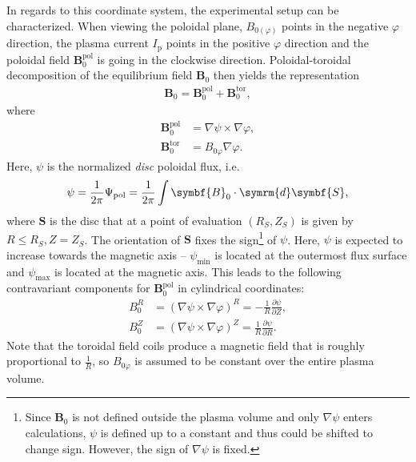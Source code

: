 \documentclass[a4paper, twoside, 10pt, english]{article}
\numberwithin{equation}{section}
\let\temp\varrho
\let\varrho\rho
\let\rho\temp
\let\temp\vartheta
\let\vartheta\theta
\let\theta\temp
\let\temp\varphi
\let\varphi\phi
\let\phi\temp
\let\vec\symbf
\newcommand*\grad{\ensuremath{\nabla}}
\newcommand*\diff{\ensuremath{\symrm{d}}}  %
\newcommand*\pd[2][]{\ensuremath{\frac{\partial #1}{\partial #2}}}  %
\newcommand*\pol{\ensuremath{\textrm{pol}}}  %
\newcommand*\tor{\ensuremath{\textrm{tor}}}  %
\begin{document}
In regards to this coordinate system, the experimental setup can be characterized. When viewing the poloidal plane, $B_{0 (\phi)}$ points in the negative $\phi$ direction, the plasma current $I_{\text{p}}$ points in the positive $\phi$ direction and the poloidal field $\vec{B}_{0}^{\pol}$ is going in the clockwise direction. Poloidal-toroidal decomposition of the equilibrium field $\vec{B}_{0}$ then yields the representation
\begin{gather}
  \vec{B}_{0} = \vec{B}_{0}^{\pol} + \vec{B}_{0}^{\tor}, \label{eq:B_pol_tor}
\end{gather}
where 
\begin{align}
  \vec{B}_{0}^{\pol} &= \grad \psi \times \grad \phi, \label{eq:B_pol} \\
  \vec{B}_{0}^{\tor} &= B_{0 \phi} \grad \phi. \label{eq:B_tor}
\end{align}
Here, $\psi$ is the normalized \emph{disc} poloidal flux, i.e.
\begin{gather}
  \psi = \frac{1}{2 \pi} \Psi_{\pol} = \frac{1}{2 \pi} \int \vec{B}_{0} \cdot \diff \vec{S},
\end{gather}
where $\vec{S}$ is the disc that at a point of evaluation $(R_{S}, Z_{S})$ is given by $R \leq R_{S}, Z = Z_{S}$. The orientation of $\vec{S}$ fixes the sign\footnote{Since $\vec{B}_{0}$ is not defined outside the plasma volume and only $\grad \psi$ enters calculations, $\psi$ is defined up to a constant and thus could be shifted to change sign. However, the sign of $\grad \psi$ is fixed.} of $\psi$. Here, $\psi$ is expected to increase towards the magnetic axis -- $\psi_{\text{min}}$ is located at the outermost flux surface and $\psi_{\text{max}}$ is located at the magnetic axis. This leads to the following contravariant components for $\vec{B}_{0}^{\pol}$ in cylindrical coordinates:
\begin{align}
  B_{0}^{R} &= (\grad \psi \times \grad \phi)^{R} = -\frac{1}{R} \pd[\psi]{Z}, \\
  B_{0}^{Z} &= (\grad \psi \times \grad \phi)^{Z} = \frac{1}{R} \pd[\psi]{R}.
\end{align}
Note that the toroidal field coils produce a magnetic field that is roughly proportional to $\frac{1}{R}$, so $B_{0 \phi}$ is assumed to be constant over the entire plasma volume.
\end{document}
